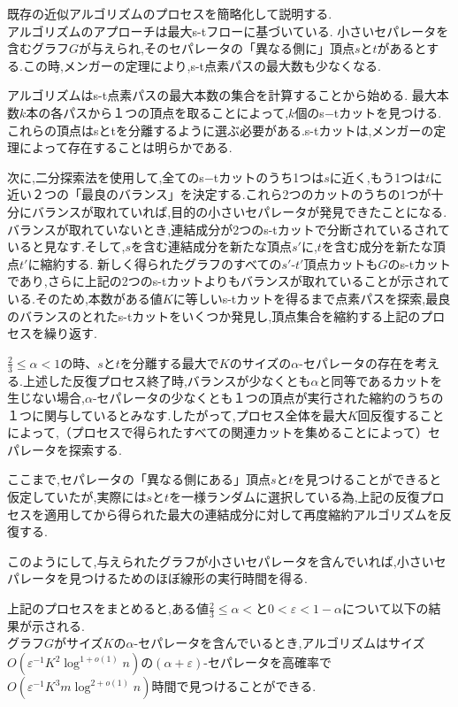 \documentclass{thesis}
\theoremstyle{definition}
\begin{document}
既存の近似アルゴリズムのプロセスを簡略化して説明する.\\

アルゴリズムのアプローチは最大s-tフローに基づいている.
小さいセパレータを含むグラフ$G$が与えられ,そのセパレータの「異なる側に」頂点$s$と$t$があるとする.この時,メンガーの定理により,s-t点素パスの最大数も少なくなる.\par
アルゴリズムはs-t点素パスの最大本数の集合を計算することから始める.
最大本数$k$本の各パスから１つの頂点を取ることによって,$k$個のs−tカットを見つける.これらの頂点はsとtを分離するように選ぶ必要がある.s-tカットは,メンガーの定理によって存在することは明らかである.\par

次に,二分探索法を使用して,全てのs−tカットのうち1つは$s$に近く,もう1つは$t$に近い２つの「最良のバランス」を決定する.これら2つのカットのうちの1つが十分にバランスが取れていれば,目的の小さいセパレータが発見できたことになる.バランスが取れていないとき,連結成分が2つのs-tカットで分断されているされていると見なす.そして,$s$を含む連結成分を新たな頂点$s'$に,$t$を含む成分を新たな頂点$t'$に縮約する.
新しく得られたグラフのすべての$s'$-$t'$頂点カットも$G$のs-tカットであり,さらに上記の2つのs-tカットよりもバランスが取れていることが示されている.そのため,本数がある値$K$に等しいs-tカットを得るまで点素パスを探索,最良のバランスのとれたs-tカットをいくつか発見し,頂点集合を縮約する上記のプロセスを繰り返す.\par

$\frac{2}{3} \leq \alpha < 1$の時、$s$と$t$を分離する最大で$K$のサイズの$\alpha$-セパレータの存在を考える.上述した反復プロセス終了時,バランスが少なくとも$\alpha$と同等であるカットを生じない場合,$\alpha$-セパレータの少なくとも１つの頂点が実行された縮約のうちの１つに関与しているとみなす.したがって,プロセス全体を最大$K$回反復することによって,（プロセスで得られたすべての関連カットを集めることによって）セパレータを探索する.\par

ここまで,セパレータの「異なる側にある」頂点$s$と$t$を見つけることができると仮定していたが,実際には$s$と$t$を一様ランダムに選択している為,上記の反復プロセスを適用してから得られた最大の連結成分に対して再度縮約アルゴリズムを反復する.\par
このようにして,与えられたグラフが小さいセパレータを含んでいれば,小さいセパレータを見つけるためのほぼ線形の実行時間を得る.\par

上記のプロセスをまとめると,ある値$\frac{2}{3} \leq \alpha <$と$0 < \varepsilon <1-\alpha$について以下の結果が示される.\\
グラフ$G$がサイズ$K$の$\alpha$-セパレータを含んでいるとき,アルゴリズムはサイズ$O(\varepsilon^{-1} K^2 \log^{1+o(1)}n)$の$(\alpha + \varepsilon)$-セパレータを高確率で$O(\varepsilon^{-1}K^3m\log^{2+o(1)}n)$時間で見つけることができる.
\end{document}
